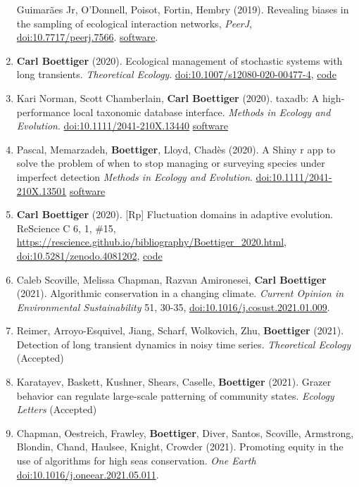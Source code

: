 \documentclass[10pt,sans]{moderncv}        %
\begin{document}
\begin{enumerate}
  Guimarães Jr, O'Donnell, Poisot, Fortin, Hembry (2019). Revealing
  biases in the sampling of ecological interaction networks,
  \emph{PeerJ},
  \href{https://doi.org/10.7717/peerj.7566}{doi:10.7717/peerj.7566}.
  \href{https://cran.r-project.org/package=EcoNetGen}{software}.
\item
  \textbf{Carl Boettiger} (2020). Ecological management of stochastic
  systems with long transients. \emph{Theoretical Ecology}.
  \href{https://doi.org/10.1007/s12080-020-00477-4}{doi:10.1007/s12080-020-00477-4},
  \href{https://github.com/cboettig/decisions-vs-transients}{code}
\item
  Kari Norman, Scott Chamberlain, \textbf{Carl Boettiger} (2020).
  taxadb: A high‐performance local taxonomic database interface.
  \emph{Methods in Ecology and Evolution}.
  \href{https://doi.org/10.1111/2041-210X.13440}{doi:10.1111/2041-210X.13440}
  \href{https://cran-r.project.org/package=taxadb}{software}
\item
  Pascal, Memarzadeh, \textbf{Boettiger}, Lloyd, Chadès (2020). A Shiny
  r app to solve the problem of when to stop managing or surveying
  species under imperfect detection \emph{Methods in Ecology and
  Evolution}.
  \href{https://doi.org/10.1111/2041-210X.13501}{doi:10.1111/2041-210X.13501}
  \href{https://github.com/conservation-decisions/smsPOMDP}{software}
\item
  \textbf{Carl Boettiger} (2020). {[}Rp{]} Fluctuation domains in
  adaptive evolution. ReScience C 6, 1, \#15,
  \url{https://rescience.github.io/bibliography/Boettiger_2020.html},
  \href{https://doi.org/10.5281/zenodo.4081202}{doi:10.5281/zenodo.4081202},
  \href{https://github.com/cboettig/fluctationDomains}{code}
\item
  Caleb Scoville, Melissa Chapman, Razvan Amironesei, \textbf{Carl
  Boettiger} (2021). Algorithmic conservation in a changing climate.
  \emph{Current Opinion in Environmental Sustainability} 51, 30-35,
  \href{https://doi.org/10.1016/j.cosust.2021.01.009}{doi:10.1016/j.cosust.2021.01.009}.
\item
  Reimer, Arroyo-Esquivel, Jiang, Scharf, Wolkovich, Zhu,
  \textbf{Boettiger} (2021). Detection of long transient dynamics in
  noisy time series. \emph{Theoretical Ecology} (Accepted)
\item
  Karatayev, Baskett, Kushner, Shears, Caselle, \textbf{Boettiger}
  (2021). Grazer behavior can regulate large-scale patterning of
  community states. \emph{Ecology Letters} (Accepted)
\item
  Chapman, Oestreich, Frawley, \textbf{Boettiger}, Diver, Santos,
  Scoville, Armstrong, Blondin, Chand, Haulsee, Knight, Crowder (2021).
  Promoting equity in the use of algorithms for high seas conservation.
  \emph{One Earth}
  \href{https://doi.org/10.1016/j.oneear.2021.05.011}{doi:10.1016/j.oneear.2021.05.011}.
\end{enumerate}
\end{document}
